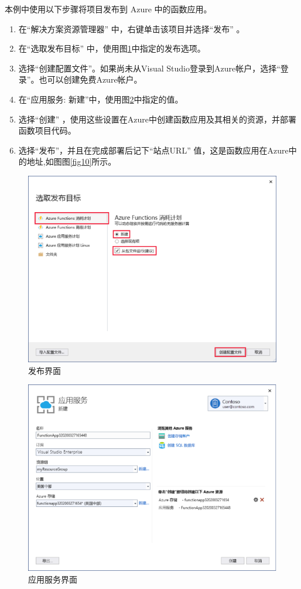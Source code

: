 \documentclass[11pt]{article}
\begin{document}
本例中使用以下步骤将项目发布到 Azure 中的函数应用。
\begin{enumerate}
	\item 在“解决方案资源管理器” 中，右键单击该项目并选择“发布” 。
	\item 在“选取发布目标” 中，使用图\ref{fig8}中指定的发布选项。
	\item 选择“创建配置文件”。如果尚未从Visual Studio登录到Azure帐户，选择“登录”。也可以创建免费Azure帐户。
	\item 在“应用服务: 新建”中，使用图\ref{fig9}中指定的值。
	\item 选择“创建” ，使用这些设置在Azure中创建函数应用及其相关的资源，并部署函数项目代码。
	\item 选择“发布”，并且在完成部署后记下“站点URL” 值，这是函数应用在Azure中的地址,如图图\ref{fig10}所示。
\end{enumerate}
\begin{figure}[h]	
	\centering
	\includegraphics[scale=0.6]{figs/8.png}        %
	\caption{发布界面}
	\label{fig8}	
\end{figure}
\begin{figure}[h]	
	\centering
	\includegraphics[scale=0.6]{figs/9.png}        %
	\caption{应用服务界面}
	\label{fig9}	
\end{figure}
\end{document}
